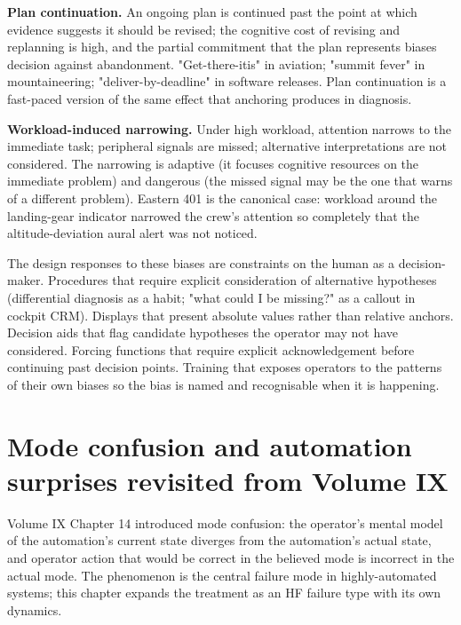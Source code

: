 \textbf{Plan continuation.} An ongoing plan is continued past the point at which evidence suggests it should be revised; the cognitive cost of revising and replanning is high, and the partial commitment that the plan represents biases decision against abandonment. "Get-there-itis" in aviation; "summit fever" in mountaineering; "deliver-by-deadline" in software releases. Plan continuation is a fast-paced version of the same effect that anchoring produces in diagnosis.

\textbf{Workload-induced narrowing.} Under high workload, attention narrows to the immediate task; peripheral signals are missed; alternative interpretations are not considered. The narrowing is adaptive (it focuses cognitive resources on the immediate problem) and dangerous (the missed signal may be the one that warns of a different problem). Eastern 401 \cite{acc:ntsb-aar73-14} is the canonical case: workload around the landing-gear indicator narrowed the crew's attention so completely that the altitude-deviation aural alert was not noticed.

The design responses to these biases are constraints on the human as a decision-maker. Procedures that require explicit consideration of alternative hypotheses (differential diagnosis as a habit; "what could I be missing?" as a callout in cockpit CRM). Displays that present absolute values rather than relative anchors. Decision aids that flag candidate hypotheses the operator may not have considered. Forcing functions that require explicit acknowledgement before continuing past decision points. Training that exposes operators to the patterns of their own biases so the bias is named and recognisable when it is happening.

\section{Mode confusion and automation surprises revisited from Volume IX}

Volume IX Chapter 14 introduced mode confusion: the operator's mental model of the automation's current state diverges from the automation's actual state, and operator action that would be correct in the believed mode is incorrect in the actual mode. The phenomenon is the central failure mode in highly-automated systems; this chapter expands the treatment as an HF failure type with its own dynamics.

